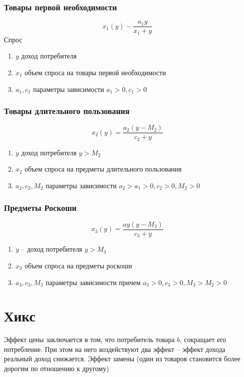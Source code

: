 \documentclass[14pt]{extarticle}
\begin{document}
 \subsubsection{Товары первой необходимости}
 \begin{equation}
 x_1(y) - \frac{a_1 y}{x_1 + y}
 \end{equation} 
 Спрос
  \begin{enumerate}
 	\item $y$ доход потребителя
	\item  $x_1$ объем спроса на товары первой необходимости
	\item $a_1,c_1$ параметры зависимости $a_1>0,c_1>0$
 \end{enumerate}
 \subsubsection{Товары длительного пользования}
 \begin{equation}
 x_2(y) = 
 \frac{a_2 (y - M_2)}{c_2 + y}
 \end{equation} 
 \begin{enumerate}
	 \item $y$ доход потребителя  $y>M_2$
	\item $x_2$ объем спроса на предметы длительного 
		пользования
	\item $a_2,c_2,M_2$ параметры зависимости $a_2>a_1>0, c_2 >0, M_2 > 0$
 \end{enumerate}
 \subsubsection{Предметы Роскоши}
 \begin{equation}
 x_3(y) = \frac{a y (y - M_3)}{c_3 + y}
 \end{equation} 
 \begin{enumerate}
 	\item $y$ -- доход потребителя  $y > M_3$
	\item $x_3$ объем спроса на предметы роскоши
	\item $a_3,c_3,M_3$ параметры зависимости причем 
		$a_3>0,c_3>0,M_3>M_2>0$
 \end{enumerate}
 \section{Хикс}
 Эффект цены заключается в том, что
 потребитель товара $b$,
 сокращает его потребление.
 При этом на него воздействуют
 два эффект -- эффект дохода 
 реальный доход снижается. 
 Эффект замены (один из товаров становится более дорогим по
 отношению к другому)
\end{document}
